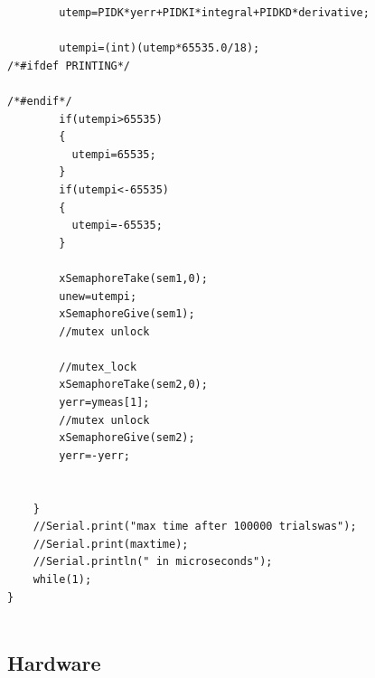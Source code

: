 \documentclass[12pt]{extarticle}
\newenvironment{sect}
  {\adjustwidth{-2.25em}{0pt}}
  {\endadjustwidth}
\begin{document}
\begin{sect}
\begin{lstlisting}
        utemp=PIDK*yerr+PIDKI*integral+PIDKD*derivative;

        utempi=(int)(utemp*65535.0/18);
/*#ifdef PRINTING*/

/*#endif*/
        if(utempi>65535)
        {
          utempi=65535;
        }
        if(utempi<-65535)
        {
          utempi=-65535;
        }
 
        xSemaphoreTake(sem1,0);
        unew=utempi;
        xSemaphoreGive(sem1);
        //mutex unlock

        //mutex_lock
        xSemaphoreTake(sem2,0);
        yerr=ymeas[1];
        //mutex unlock
        xSemaphoreGive(sem2);
        yerr=-yerr;

        
    }
    //Serial.print("max time after 100000 trialswas");
    //Serial.print(maxtime);
    //Serial.println(" in microseconds");
    while(1);
}


\end{lstlisting}
    \subsection{Hardware}
        

\end{sect}
\end{document}
